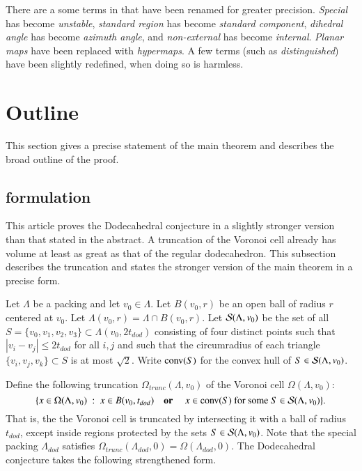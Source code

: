 There are a some terms in \cite{arx} that have been renamed for
greater precision.
{\it Special} has become {\it unstable}, {\it standard region}
has become {\it standard component},
{\it dihedral angle} has 
become {\it azimuth angle}, and {\it non-external} has
become {\it internal}.  {\it Planar maps} have been replaced with {\it hypermaps}.
A few terms (such as {\it distinguished}) have been slightly redefined, when doing so is harmless.


\section{Outline}

This section gives a precise statement of the main theorem
and describes the broad outline of the proof.


\subsection{formulation}\label{sec:form}

This article proves the Dodecahedral conjecture in a slightly
stronger version than that stated in the abstract. 
A  truncation of the Voronoi cell already has volume
at least as great as that of the regular dodecahedron.  This
subsection describes the truncation and states the stronger version
of the main theorem in a precise form.

Let $\Lambda$ be a packing and let $v_0\in\Lambda$.
Let $B(v_0,r)$ be an open ball
of radius $r$ centered at $v_0$. 
Let $\Lambda(v_0,r) = \Lambda\cap B(v_0,r)$.
Let ${\mathcal S}(\Lambda,v_0)$ 
be the set of all $S=\{v_0,v_1,v_2,v_3\}\subset\Lambda(v_0,2t_{dod})$
consisting of four distinct points such that $|v_i-v_j|\le 2t_{dod}$ for all $i,j$
and such that the circumradius of each triangle $\{v_i,v_j,v_k\}\subset S$ is at most
$\sqrt2$.   Write ${\operatorname{conv}}(S)$ for the convex hull of $S\in{\mathcal S}(\Lambda,v_0)$. 


Define the following truncation $\Omega_{trunc}(\Lambda,v_0)$ 
of the Voronoi cell $\Omega(\Lambda,v_0)$:
   $$
   \{x \in \Omega(\Lambda,v_0) \ :\    x\in B(v_0,t_{dod}) \quad\text{\bf  or }\quad x \in {\operatorname{conv}}(S)
     \text{ for some } S\in {\mathcal S}(\Lambda,v_0) \}. 
   $$
That is, the the Voronoi cell is truncated by intersecting it with a ball of radius $t_{dod}$,
except inside regions protected by the sets $S\in{\mathcal S}(\Lambda,v_0)$.
Note that the special packing $\Lambda_{dod}$ satisfies
$\Omega_{trunc}(\Lambda_{dod},0) = \Omega(\Lambda_{dod},0)$.
The  Dodecahedral conjecture takes the following strengthened form.


